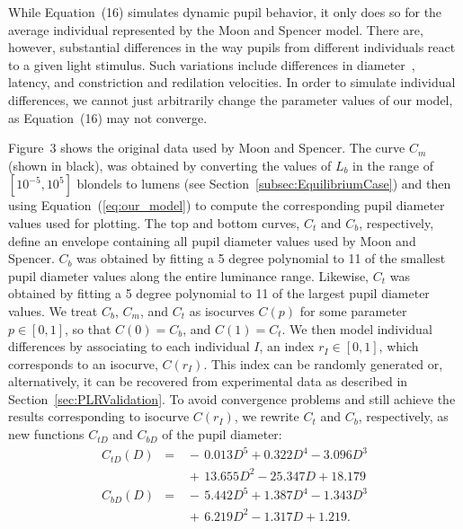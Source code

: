 \documentclass{dnacm} %
\begin{document}
While Equation~(16) simulates dynamic pupil behavior, it only does so
for the average individual represented by the Moon and Spencer model.
There are, however, substantial differences in the way pupils from
different individuals react to a given light stimulus. Such variations
include differences in diameter~\cite{google}, latency, and constriction
and redilation velocities. In order to simulate individual differences,
we cannot just arbitrarily change the parameter values of our model, as
Equation~(16) may not converge.

Figure~3 shows the original data used by Moon and Spencer. The curve
$C_m$ (shown in black), was obtained by converting the values of $L_b$
in the range of $[10^{-5}, 10^{5}]$ blondels to lumens (see
Section~\ref{subsec:EquilibriumCase}) and then using
Equation~(\ref{eq:our_model}) to compute the corresponding pupil
diameter values used for plotting. The top and bottom curves, $C_t$ and
$C_b$, respectively, define an envelope containing all pupil diameter
values used by Moon and Spencer. $C_b$ was obtained by fitting a 5
degree polynomial to 11 of the smallest pupil diameter values along the
entire luminance range. Likewise, $C_t$ was obtained by fitting a 5
degree polynomial to 11 of the largest pupil diameter values. We treat
$C_b$, $C_m$, and $C_t$ as isocurves $C(p)$ for some parameter $p \in
[0,1]$, so that $C(0) = C_b$, and $C(1) = C_t$. We then model individual
differences by associating to each individual $I$, an index $r_I \in
[0,1]$, which corresponds to an isocurve, $C(r_I)$. This index can be
randomly generated or, alternatively, it can be recovered from
experimental data as described in Section~\ref{sec:PLRValidation}. To
avoid convergence problems and still achieve the results corresponding
to isocurve $C(r_I)$, we rewrite $C_t$ and $C_b$, respectively, as new
functions $C_{tD}$ and $C_{bD}$ of the pupil diameter:
\begin{eqnarray}
\label{eq:ctD}
  C_{tD}(D) &=& \,{-}\,0.013 D^5  +  0.322 D^4 - 3.096 D^3\nonumber\\
              &&\,{+}\,13.655 D^2 - 25.347 D + 18.179\\
\label{eq:cbD}
  C_{bD}(D) &=& \,{-}\,5.442 D^5 + 1.387 D^4 - 1.343 D^3\nonumber\\
              &&\,{+}\,6.219 D^2 - 1.317 D   + 1.219.
\end{eqnarray}
%
\end{document}
